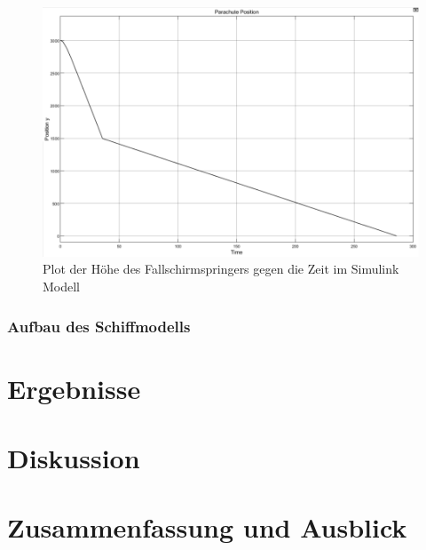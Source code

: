 \documentclass[]{iat}
\begin{document}
\begin{figure}[H]
    \includegraphics[width=\textwidth]{graphics/simulink_parachute_s_plot.png}
    \centering
    \caption{Plot der Höhe des Fallschirmspringers gegen die Zeit im Simulink Modell}
    \label{fig:simulink_parachute_s_plot}
\end{figure}

\newpage
\subsection{Aufbau des Schiffmodells} \label{sec:aufbau_schiffsmodell}

\chapter{Ergebnisse} \label{sec:ergebnisse}

\chapter{Diskussion} \label{sec:diskussion}

\chapter{Zusammenfassung und Ausblick} \label{sec:zsmfassung_ausblick}
\end{document}
